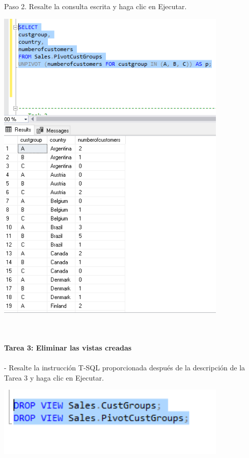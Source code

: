 \begin{flushleft}
Paso 2. Resalte la consulta escrita y haga clic en Ejecutar.
\begin{center}
	\includegraphics[width=11cm]{./Imagenes/5img5} 
\end{center}
\textbf{}\\
\textbf{}\\
\textbf {Tarea 3: Eliminar las vistas creadas}
\textbf{}\\
\textbf{}\\
- Resalte la instrucción T-SQL proporcionada después de la descripción de la Tarea 3 y haga clic en Ejecutar.
\begin{center}
	\includegraphics[width=11cm]{./Imagenes/5img6} 
\end{center}














	


 

\end{flushleft}